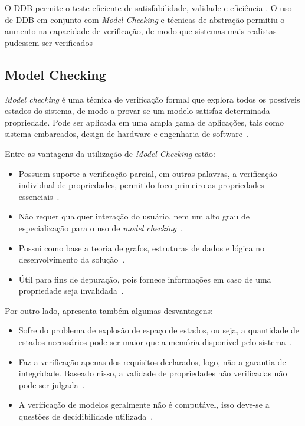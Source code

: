 \par
O DDB permite o teste eficiente de satisfabilidade, validade e eficiência \cite{kropf2013introduction}. O uso de DDB em conjunto com \textit{Model Checking} e técnicas de abstração permitiu o aumento na capacidade de verificação, de modo que sistemas mais realistas pudessem ser verificados\cite{biere2003bounded}

\subsection{Model Checking}
\par
\textit{Model checking} é uma técnica de verificação formal que explora todos os possíveis estados do sistema, de modo a provar se um modelo satisfaz determinada propriedade. Pode ser aplicada em uma ampla gama de aplicações, tais como sistema embarcados, design de hardware e engenharia de software~\cite{baier2008principles}.

\par
Entre as vantagens da utilização de \textit{Model Checking} estão:
\begin{itemize}
    \item Possuem suporte a verificação parcial, em outras palavras, a verificação individual de propriedades, permitido foco primeiro as propriedades essenciais~\cite{baier2008principles}.
    \item Não requer qualquer interação do usuário, nem um alto grau de especialização para o uso de \textit{model checking}~\cite{baier2008principles}.
    \item Possui como base a teoria de grafos, estruturas de dados e lógica no desenvolvimento da solução~\cite{baier2008principles}.
    \item Útil para fins de depuração, pois fornece informações em caso de uma propriedade seja invalidada~\cite{baier2008principles}.
\end{itemize}

\par
Por outro lado, apresenta também algumas desvantagens:
\begin{itemize}
    \item Sofre do problema de explosão de espaço de estados, ou seja, a quantidade de estados necessários pode ser maior que a memória disponível pelo sistema~\cite{baier2008principles}.
    \item Faz a verificação apenas dos requisitos declarados, logo, não a garantia de integridade. Baseado nisso, a validade de propriedades não verificadas não pode ser julgada~\cite{baier2008principles}.
    \item A verificação de modelos geralmente não é computável,  isso deve-se a questões de decidibilidade utilizada~\cite{baier2008principles}.
\end{itemize}

